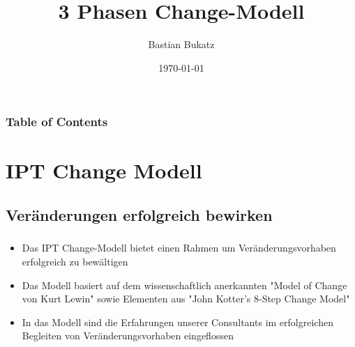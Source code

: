 \documentclass[aspectratio=169]{beamer}
\title{3 Phasen Change-Modell}
\subtitle{\fontsize{40}{40}\color{ice-blue}\SnowflakeChevron\raisebox{0.3cm}{\color{ipt-red}\selectfont~$\approx$~}\raisebox{0.2cm}{\selectfont\color{ipt-blue}\#}}
\author{Bastian Bukatz}
\institute{Innovation Process Technology}
\date{\today}
\begin{document}
\begin{frame}
\titlepage
\end{frame}



\begin{frame}
\frametitle{Table of Contents}
\tableofcontents
\end{frame}


\section{IPT Change Modell}
\subsection{Veränderungen erfolgreich bewirken}
\begin{frame}
\frametitle{\secname}\framesubtitle{\subsecname}
\begin{itemize}[label={$\bullet$}]
\item Das IPT Change-Modell bietet einen Rahmen um Veränderungsvorhaben erfolgreich zu bewältigen
\item Das Modell basiert auf dem wissenschaftlich anerkannten "Model of Change von Kurt Lewin" sowie Elementen aus "John Kotter's 8-Step Change Model"
\item In das Modell sind die Erfahrungen unserer Consultants im erfolgreichen Begleiten von Veränderungsvorhaben eingeflossen
\end{itemize}
\end{frame}
\end{document}
